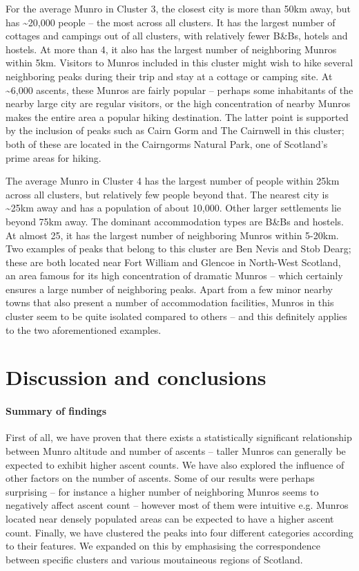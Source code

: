 \documentclass[11pt,a4paper]{article}
\begin{document}
For the average Munro in Cluster 3, the closest city is more than 50km away, but has \textasciitilde 20,000 people – the most across all clusters. It has the largest number of cottages and campings out of all clusters, with relatively fewer B&Bs, hotels and hostels. At more than 4, it also has the largest number of neighboring Munros within 5km. Visitors to Munros included in this cluster might wish to hike several neighboring peaks during their trip and stay at a cottage or camping site. At \textasciitilde 6,000 ascents, these Munros are fairly popular – perhaps some inhabitants of the nearby large city are regular visitors, or the high concentration of nearby Munros makes the entire area a popular hiking destination. The latter point is supported by the inclusion of peaks such as Cairn Gorm and The Cairnwell in this cluster; both of these are located in the Cairngorms Natural Park, one of Scotland's prime areas for hiking.

The average Munro in Cluster 4 has the largest number of people within 25km across all clusters, but relatively few people beyond that. The nearest city is \textasciitilde 25km away and has a population of about 10,000. Other larger settlements lie beyond 75km away. The dominant accommodation types are B&Bs and hostels. At almost 25, it has the largest number of neighboring Munros within 5-20km. Two examples of peaks that belong to this cluster are Ben Nevis and Stob Dearg; these are both located near Fort William and Glencoe in North-West Scotland, an area famous for its high concentration of dramatic Munros – which certainly ensures a large number of neighboring peaks. Apart from a few minor nearby towns that also present a number of accommodation facilities, Munros in this cluster seem to be quite isolated compared to others – and this definitely applies to the two aforementioned examples.

\section{Discussion and conclusions}

\paragraph{Summary of findings}
First of all, we have proven that there exists a statistically significant relationship between Munro altitude and number of ascents – taller Munros can generally be expected to exhibit higher ascent counts. We have also explored the influence of other factors on the number of ascents. Some of our results were perhaps surprising – for instance a higher number of neighboring Munros seems to negatively affect ascent count – however most of them were intuitive e.g. Munros located near densely populated areas can be expected to have a higher ascent count. Finally, we have clustered the peaks into four different categories according to their features. We expanded on this by emphasising the correspondence between specific clusters and various moutaineous regions of Scotland.
\end{document}
